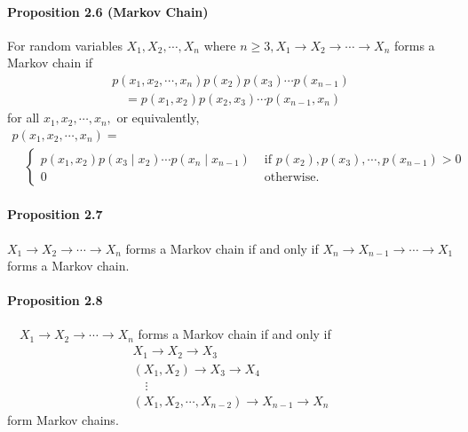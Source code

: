 \documentclass[8pt]{article}
\begin{document}
\paragraph{Proposition 2.6 (Markov Chain)} For random variables $X_{1}, X_{2}, \cdots, X_{n}$ where $n \geq 3, X_{1} \rightarrow X_{2} \rightarrow \cdots \rightarrow X_{n}$ forms a Markov chain if
$$
\begin{array}{l}
p\left(x_{1}, x_{2}, \cdots, x_{n}\right) p\left(x_{2}\right) p\left(x_{3}\right) \cdots p\left(x_{n-1}\right) \\
\quad=p\left(x_{1}, x_{2}\right) p\left(x_{2}, x_{3}\right) \cdots p\left(x_{n-1}, x_{n}\right)
\end{array}
$$
for all $x_{1}, x_{2}, \cdots, x_{n},$ or equivalently,
$$
\begin{array}{l}
p\left(x_{1}, x_{2}, \cdots, x_{n}\right)= \\
\quad\left\{\begin{array}{ll}
p\left(x_{1}, x_{2}\right) p\left(x_{3} \mid x_{2}\right) \cdots p\left(x_{n} \mid x_{n-1}\right) & \text { if } p\left(x_{2}\right), p\left(x_{3}\right), \cdots, p\left(x_{n-1}\right)>0 \\
0 & \text { otherwise. }
\end{array}\right.
\end{array}
$$

\paragraph{Proposition 2.7} $X_{1} \rightarrow X_{2} \rightarrow \cdots \rightarrow X_{n}$ forms a Markov chain if and only if $X_{n} \rightarrow X_{n-1} \rightarrow \cdots \rightarrow X_{1}$ forms a Markov chain.

\paragraph{Proposition 2.8} $\quad X_{1} \rightarrow X_{2} \rightarrow \cdots \rightarrow X_{n}$ forms a Markov chain if and only if
$$
\begin{array}{l}
X_{1} \rightarrow X_{2} \rightarrow X_{3} \\
\left(X_{1}, X_{2}\right) \rightarrow X_{3} \rightarrow X_{4} \\
\quad \vdots \\
\left(X_{1}, X_{2}, \cdots, X_{n-2}\right) \rightarrow X_{n-1} \rightarrow X_{n}
\end{array}
$$
form Markov chains.
\end{document}

